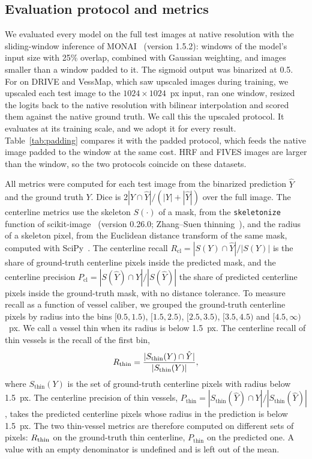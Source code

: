 \subsection{Evaluation protocol and metrics}
\label{subsec:method_metrics}

We evaluated every model on the full test images at native resolution with the sliding-window inference of MONAI~\cite{cardoso2022monai} (version 1.5.2): windows of the model's input size with 25\% overlap, combined with Gaussian weighting, and images smaller than a window padded to it. The sigmoid output was binarized at 0.5. For \medsam{} on DRIVE and VessMap, which saw upscaled images during training, we upscaled each test image to the $1024 \times 1024$~px input, ran one window, resized the logits back to the native resolution with bilinear interpolation and scored them against the native ground truth. We call this the upscaled protocol. It evaluates \medsam{} at its training scale, and we adopt it for every \medsam{} result. Table~\ref{tab:padding} compares it with the padded protocol, which feeds the native image padded to the window at the same cost. HRF and FIVES images are larger than the window, so the two protocols coincide on these datasets.

All metrics were computed for each test image from the binarized prediction $\hat{Y}$ and the ground truth $Y$. Dice is $2|Y \cap \hat{Y}| / (|Y| + |\hat{Y}|)$ over the full image. The centerline metrics use the skeleton $S(\cdot)$ of a mask, from the \texttt{skeletonize} function of scikit-image~\cite{vanderwalt2014scikit} (version 0.26.0; Zhang--Suen thinning~\cite{zhang1984fast}), and the radius of a skeleton pixel, from the Euclidean distance transform of the same mask, computed with SciPy~\cite{virtanen2020scipy}. The centerline recall $R_{\mathrm{cl}} = |S(Y) \cap \hat{Y}| / |S(Y)|$ is the share of ground-truth centerline pixels inside the predicted mask, and the centerline precision $P_{\mathrm{cl}} = |S(\hat{Y}) \cap Y| / |S(\hat{Y})|$ the share of predicted centerline pixels inside the ground-truth mask, with no distance tolerance. To measure recall as a function of vessel caliber, we grouped the ground-truth centerline pixels by radius into the bins $[0.5, 1.5)$, $[1.5, 2.5)$, $[2.5, 3.5)$, $[3.5, 4.5)$ and $[4.5, \infty)$~px. We call a vessel thin when its radius is below 1.5~px. The centerline recall of thin vessels is the recall of the first bin,
\begin{equation}
    R_{\mathrm{thin}} = \frac{|S_{\mathrm{thin}}(Y) \cap \hat{Y}|}{|S_{\mathrm{thin}}(Y)|},
    \label{eq:thin_recall}
\end{equation}
where $S_{\mathrm{thin}}(Y)$ is the set of ground-truth centerline pixels with radius below 1.5~px. The centerline precision of thin vessels, $P_{\mathrm{thin}} = |S_{\mathrm{thin}}(\hat{Y}) \cap Y| / |S_{\mathrm{thin}}(\hat{Y})|$, takes the predicted centerline pixels whose radius in the prediction is below 1.5~px. The two thin-vessel metrics are therefore computed on different sets of pixels: $R_{\mathrm{thin}}$ on the ground-truth thin centerline, $P_{\mathrm{thin}}$ on the predicted one. A value with an empty denominator is undefined and is left out of the mean.

